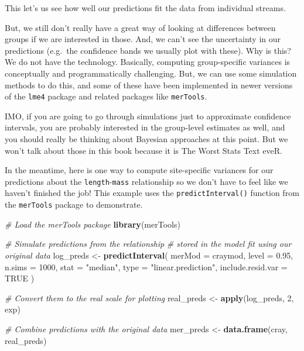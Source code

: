 \documentclass[
]{book}
\newenvironment{Shaded}{\begin{snugshade}}{\end{snugshade}}
\newcommand{\CommentTok}[1]{\textcolor[rgb]{0.56,0.35,0.01}{\textit{#1}}}
\newcommand{\DataTypeTok}[1]{\textcolor[rgb]{0.13,0.29,0.53}{#1}}
\newcommand{\DecValTok}[1]{\textcolor[rgb]{0.00,0.00,0.81}{#1}}
\newcommand{\FloatTok}[1]{\textcolor[rgb]{0.00,0.00,0.81}{#1}}
\newcommand{\KeywordTok}[1]{\textcolor[rgb]{0.13,0.29,0.53}{\textbf{#1}}}
\newcommand{\NormalTok}[1]{#1}
\newcommand{\OtherTok}[1]{\textcolor[rgb]{0.56,0.35,0.01}{#1}}
\newcommand{\StringTok}[1]{\textcolor[rgb]{0.31,0.60,0.02}{#1}}
\begin{document}
This let's us see how well our predictions fit the data from individual streams.

But, we still don't really have a great way of looking at differences between groups if we are interested in those. And, we can't see the uncertainty in our predictions (e.g.~the confidence bands we usually plot with these). Why is this? We do not have the technology. Basically, computing group-specific variances is conceptually and programmatically challenging. But, we can use some simulation methods to do this, and some of these have been implemented in newer versions of the \texttt{lme4} package and related packages like \texttt{merTools}.

IMO, if you are going to go through simulations just to approximate confidence intervals, you are probably interested in the group-level estimates as well, and you should really be thinking about Bayesian approaches at this point. But we won't talk about those in this book because it is The Worst Stats Text eveR.

In the meantime, here is one way to compute site-specific variances for our predictions about the \texttt{length}-\texttt{mass} relationship so we don't have to feel like we haven't finished the job! This example uses the \texttt{predictInterval()} function from the \texttt{merTools} package to demonstrate.

\begin{Shaded}
\begin{Highlighting}[]
\CommentTok{# Load the merTools package}
\KeywordTok{library}\NormalTok{(merTools)}

\CommentTok{# Simulate predictions from the relationship}
\CommentTok{# stored in the model fit using our original data}
\NormalTok{log_preds <-}\StringTok{ }\KeywordTok{predictInterval}\NormalTok{(}
  \DataTypeTok{merMod =}\NormalTok{ craymod,}
  \DataTypeTok{level =} \FloatTok{0.95}\NormalTok{, }\DataTypeTok{n.sims =} \DecValTok{1000}\NormalTok{,}
  \DataTypeTok{stat =} \StringTok{"median"}\NormalTok{, }\DataTypeTok{type =} \StringTok{"linear.prediction"}\NormalTok{,}
  \DataTypeTok{include.resid.var =} \OtherTok{TRUE}
\NormalTok{)}

\CommentTok{# Convert them to the real scale for plotting}
\NormalTok{real_preds <-}\StringTok{ }\KeywordTok{apply}\NormalTok{(log_preds, }\DecValTok{2}\NormalTok{, exp)}

\CommentTok{# Combine predictions with the original data}
\NormalTok{mer_preds <-}\StringTok{ }\KeywordTok{data.frame}\NormalTok{(cray, real_preds)}
\end{Highlighting}
\end{Shaded}
\end{document}
